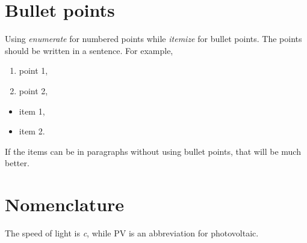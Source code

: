 \break
\section{Bullet points}
Using \textit{enumerate} for numbered points while \textit{itemize} for bullet points. The points should be written in a sentence. For example, 
\begin{enumerate} \label{pt:num}
    \item point 1,
    \item point 2, 
\end{enumerate}
\begin{itemize} \label{pt:item}
    \item item 1, 
    \item item 2. 
\end{itemize}
If the items can be in paragraphs without using bullet points, that will be much better. 

\section{Nomenclature}
The speed of light is \textit{c}, while PV is an abbreviation for photovoltaic.

